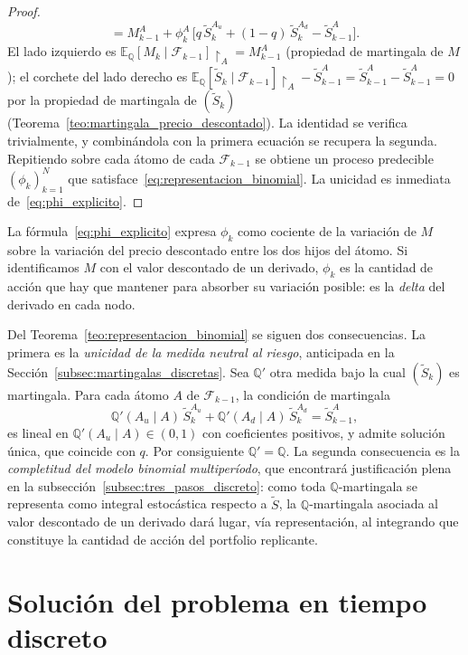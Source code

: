 \documentclass[11pt,a4paper,oneside]{report}
\theoremstyle{plain}
\theoremstyle{definition}
\theoremstyle{remark}
\newcommand{\E}{\mathbb{E}}
\newcommand{\Q}{\mathbb{Q}}
\newcommand{\F}{\mathcal{F}}
\newcommand{\1}{\mathbf{1}}
\begin{document}
\begin{proof}
\begin{equation*}
  = M_{k-1}^A + \phi_k^A\,
    \bigl[q\, \widetilde S_k^{A_u} + (1-q)\, \widetilde S_k^{A_d}
          - \widetilde S_{k-1}^A\bigr].
\end{equation*}
El lado izquierdo es $\E_\Q[M_k \mid \F_{k-1}]\restriction_A = M_{k-1}^A$
(propiedad de martingala de $M$); el corchete del lado derecho es
$\E_\Q[\widetilde S_k \mid \F_{k-1}]\restriction_A - \widetilde S_{k-1}^A
= \widetilde S_{k-1}^A - \widetilde S_{k-1}^A = 0$ por la propiedad de
martingala de $(\widetilde S_k)$
(Teorema~\ref{teo:martingala_precio_descontado}). La identidad se
verifica trivialmente, y combinándola con la primera ecuación se
recupera la segunda. Repitiendo sobre cada átomo de cada $\F_{k-1}$ se
obtiene un proceso predecible $(\phi_k)_{k=1}^N$ que
satisface~\eqref{eq:representacion_binomial}. La unicidad es inmediata
de~\eqref{eq:phi_explicito}.
\end{proof}

La
fórmula~\eqref{eq:phi_explicito} expresa $\phi_k$ como cociente de la
variación de $M$ sobre la variación del precio descontado entre los dos
hijos del átomo. Si identificamos $M$ con el valor descontado de un
derivado, $\phi_k$ es la cantidad de acción que hay que mantener para
absorber su variación posible: es la \emph{delta} del derivado en cada
nodo.

Del Teorema~\ref{teo:representacion_binomial} se siguen dos consecuencias. La primera es la \emph{unicidad de
la medida neutral al riesgo}, anticipada en
la Sección~\ref{subsec:martingalas_discretas}. Sea $\Q'$ otra medida bajo la cual
$(\widetilde S_k)$ es martingala. Para cada átomo $A$ de $\F_{k-1}$, la
condición de martingala
\begin{equation*}
  \Q'(A_u \mid A)\, \widetilde S_k^{A_u}
  + \Q'(A_d \mid A)\, \widetilde S_k^{A_d}
  = \widetilde S_{k-1}^A,
\end{equation*}
es lineal en $\Q'(A_u \mid A) \in (0, 1)$ con coeficientes positivos, y
admite solución única, que coincide con $q$. Por consiguiente $\Q' =
\Q$. La segunda consecuencia es la \emph{completitud del modelo
binomial multiperíodo}, que encontrará justificación plena en la
subsección~\ref{subsec:tres_pasos_discreto}: como toda $\Q$-martingala
se representa como integral estocástica respecto a $\widetilde S$, la
$\Q$-martingala asociada al valor descontado de un derivado dará lugar,
vía representación, al integrando que constituye la cantidad de acción
del portfolio replicante.

\section{Solución del problema en tiempo discreto}
\label{sec:solucion_discreto}
\end{document}
